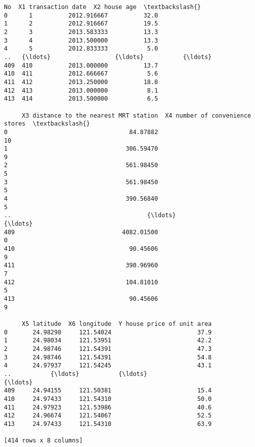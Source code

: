 \documentclass[11pt]{article}
\makeatletter
\newcommand{\boxspacing}{\kern\kvtcb@left@rule\kern\kvtcb@boxsep}
\newcommand{\prompt}[4]{
        {\ttfamily\llap{{\color{#2}[#3]:\hspace{3pt}#4}}\vspace{-\baselineskip}}
    }
\makeatother
\begin{document}
            \begin{tcolorbox}[breakable, size=fbox, boxrule=.5pt, pad at break*=1mm, opacityfill=0]
\prompt{Out}{outcolor}{205}{\boxspacing}
\begin{Verbatim}[commandchars=\\\{\}]
      No  X1 transaction date  X2 house age  \textbackslash{}
0      1          2012.916667          32.0
1      2          2012.916667          19.5
2      3          2013.583333          13.3
3      4          2013.500000          13.3
4      5          2012.833333           5.0
..   {\ldots}                  {\ldots}           {\ldots}
409  410          2013.000000          13.7
410  411          2012.666667           5.6
411  412          2013.250000          18.8
412  413          2013.000000           8.1
413  414          2013.500000           6.5

     X3 distance to the nearest MRT station  X4 number of convenience stores  \textbackslash{}
0                                  84.87882                               10
1                                 306.59470                                9
2                                 561.98450                                5
3                                 561.98450                                5
4                                 390.56840                                5
..                                      {\ldots}                              {\ldots}
409                              4082.01500                                0
410                                90.45606                                9
411                               390.96960                                7
412                               104.81010                                5
413                                90.45606                                9

     X5 latitude  X6 longitude  Y house price of unit area
0       24.98298     121.54024                        37.9
1       24.98034     121.53951                        42.2
2       24.98746     121.54391                        47.3
3       24.98746     121.54391                        54.8
4       24.97937     121.54245                        43.1
..           {\ldots}           {\ldots}                         {\ldots}
409     24.94155     121.50381                        15.4
410     24.97433     121.54310                        50.0
411     24.97923     121.53986                        40.6
412     24.96674     121.54067                        52.5
413     24.97433     121.54310                        63.9

[414 rows x 8 columns]
\end{Verbatim}
\end{tcolorbox}
        
\end{document}
